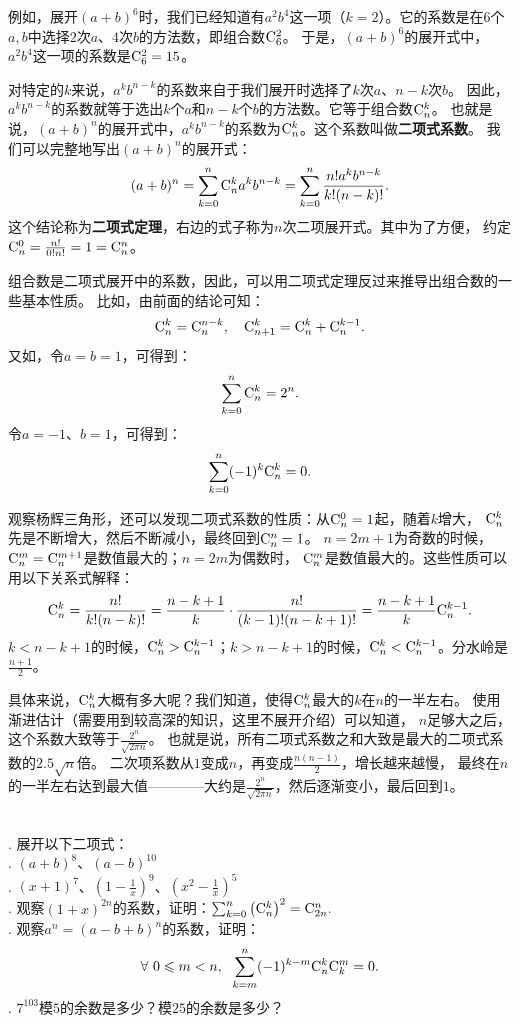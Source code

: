 \documentclass[12pt,UTF8,fontset=none]{ctexbook}
\begin{document}
例如，展开$(a+b)^6$时，我们已经知道有$a^2b^4$这一项（$k=2$）。它的系数是在$6$个$a,b$中选择$2$次$a$、$4$次$b$的方法数，即组合数$\mathrm{C}_{6}^{2}$。
于是，$(a+b)^6$的展开式中，$a^2b^4$这一项的系数是$\mathrm{C}_{6}^{2} = 15$。

对特定的$k$来说，$a^kb^{n-k}$的系数来自于我们展开时选择了$k$次$a$、$n-k$次$b$。
因此，$a^kb^{n-k}$的系数就等于选出$k$个$a$和$n-k$个$b$的方法数。它等于组合数$\mathrm{C}_{n}^{k}$。
也就是说，$(a+b)^n$的展开式中，$a^kb^{n-k}$的系数为$\mathrm{C}_{n}^{k}$。这个系数叫做\textbf{二项式系数}。
我们可以完整地写出$(a+b)^n$的展开式：
$$(a+b)^n = \sum_{k=0}^n \mathrm{C}_{n}^{k} a^kb^{n-k} = \sum_{k=0}^n \frac{n!a^kb^{n-k}}{k!(n-k)!} .$$
这个结论称为\textbf{二项式定理}，右边的式子称为$n$次二项展开式。其中为了方便，
约定$\mathrm{C}_{n}^{0} = \frac{n!}{0!n!} = 1 = \mathrm{C}_{n}^{n}$。

组合数是二项式展开中的系数，因此，可以用二项式定理反过来推导出组合数的一些基本性质。
比如，由前面的结论可知：
$$\mathrm{C}_{n}^{k} = \mathrm{C}_{n}^{n-k}, \quad \mathrm{C}_{n+1}^{k} = \mathrm{C}_{n}^{k} + \mathrm{C}_{n}^{k-1}.$$
又如，令$a=b=1$，可得到：
$$\sum_{k=0}^n \mathrm{C}_{n}^{k} = 2^n.$$
令$a=-1$、$b=1$，可得到：
$$\sum_{k=0}^n (-1)^k \mathrm{C}_{n}^{k} = 0.$$

观察杨辉三角形，还可以发现二项式系数的性质：从$\mathrm{C}_{n}^{0}=1$起，随着$k$增大，
$\mathrm{C}_{n}^{k}$先是不断增大，然后不断减小，最终回到$\mathrm{C}_{n}^{n} = 1$。
$n=2m+1$为奇数的时候，$\mathrm{C}_{n}^{m}=\mathrm{C}_{n}^{m+1}$是数值最大的；$n=2m$为偶数时，
$\mathrm{C}_{n}^{m}$是数值最大的。这些性质可以用以下关系式解释：
$$ \mathrm{C}_{n}^{k} = \frac{n!}{k!(n-k)!} = \frac{n-k+1}{k}\cdot \frac{n!}{(k-1)!(n-k+1)!} = \frac{n-k+1}{k}\mathrm{C}_{n}^{k-1}.$$
$k < n-k+1$的时候，$\mathrm{C}_{n}^{k} > \mathrm{C}_{n}^{k-1}$；$k > n-k+1$的时候，$\mathrm{C}_{n}^{k} < \mathrm{C}_{n}^{k-1}$。分水岭是$\frac{n+1}{2}$。

具体来说，$\mathrm{C}_{n}^{k}$大概有多大呢？我们知道，使得$\mathrm{C}_{n}^{k}$最大的$k$在$n$的一半左右。
使用渐进估计（需要用到较高深的知识，这里不展开介绍）可以知道，
$n$足够大之后，这个系数大致等于$\frac{2^{n}}{\sqrt{2\pi n}}$。
也就是说，所有二项式系数之和大致是最大的二项式系数的$2.5\sqrt{n}$倍。
二次项系数从$1$变成$n$，再变成$\frac{n(n-1)}{2}$，增长越来越慢，
最终在$n$的一半左右达到最大值————大约是$\frac{2^{n}}{\sqrt{2\pi n}}$，然后逐渐变小，最后回到$1$。

\begin{xt}
    \mbox{} \\
    . 展开以下二项式：\\
    . $(a+b)^8$、$(a-b)^{10}$ \\
    . $(x+1)^7$、$(1-\frac{1}{x})^9$、$(x^2-\frac{1}{x})^5$ \\
    . 观察$(1+x)^{2n}$的系数，证明：$\sum_{k=0}^n \left(\mathrm{C}_{n}^{k}\right)^2 = \mathrm{C}_{2n}^{n}.$ \\
    . 观察$a^n = (a-b+b)^n$的系数，证明：
                $$\forall \,\, 0 \leqslant m < n, \;\,\, \sum_{k=m}^n (-1)^{k-m} \mathrm{C}_{n}^{k}\mathrm{C}_{k}^{m} = 0.$$
    . $7^{103}$模$5$的余数是多少？模$25$的余数是多少？

\end{xt}
\end{document}
